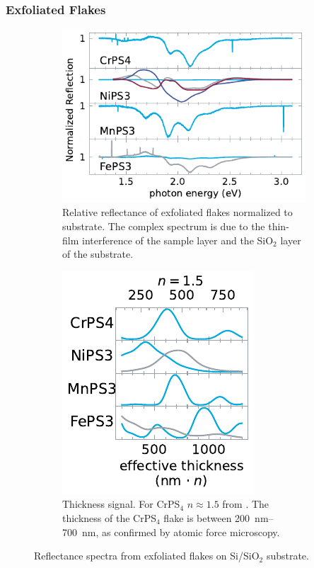 \documentclass[
	twoside,
	parskip=half,
	a4paper,
]{scrbook}
\begin{document}
\subsubsection*{Exfoliated Flakes}
\begin{figure}
	\centering
	\begin{subfigure}[c]{3.5in}
		\centering
		\includegraphics{../figures/2024-04-10 normalized reflection spectra.pdf}
		\caption{Relative reflectance of exfoliated flakes normalized to substrate.
		The complex spectrum is due to the thin-film interference of the sample layer and the SiO$_2$ layer of the substrate.}
		\label{fig:reflection flakes}
	\end{subfigure}
	\begin{subfigure}[c]{2in}
		\centering
		\includegraphics{../figures/2024-03-14 thickness flakes.pdf}
		\caption{
		Thickness signal.
		For CrPS$_4$  $n\approx1.5$ from \cite{CrPS4_refrative}. 
		The thickness of the CrPS$_4$ flake is between \SIrange{200}{700}{nm}, as confirmed by atomic force microscopy.
	}
		\label{fig:thickness flakes}
	\end{subfigure}
	\caption{Reflectance spectra from exfoliated flakes on Si/SiO$_2$ substrate.}
\end{figure}
\end{document}
